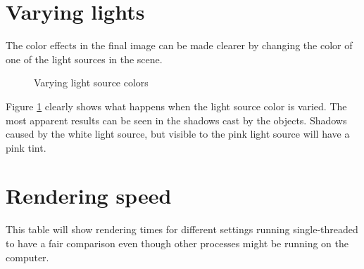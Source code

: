 \documentclass[a4paper]{report}
\begin{document}
\section{Varying lights}

The color effects in the final image can be made clearer by changing
the color of one of the light sources in the scene.

\begin{figure}
  \centering
  \caption{Varying light source colors}
  \label{fig:lightcolor}
\end{figure}

Figure \ref{fig:lightcolor} clearly shows what happens when the light
source color is varied. The most apparent results can be seen in the
shadows cast by the objects. Shadows caused by the white light source,
but visible to the pink light source will have a pink tint.

\section{Rendering speed}

This table will show rendering times for different settings running
single-threaded to have a fair comparison even though other processes
might be running on the computer.
\end{document}
